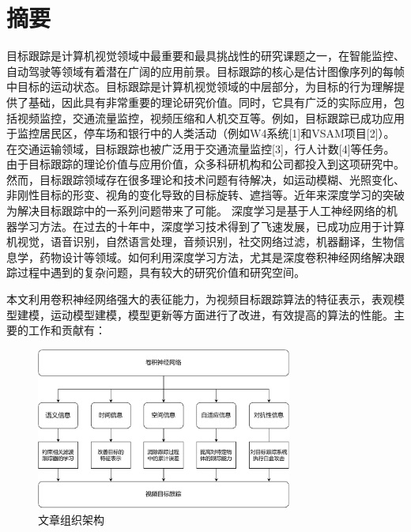 \maketitle%
\MAKETITLE%
\makedeclaration%
\intobmk\chapter*{摘\quad 要}%
\setcounter{page}{1}%

目标跟踪是计算机视觉领域中最重要和最具挑战性的研究课题之一，在智能监控、自动驾驶等领域有着潜在广阔的应用前景。目标跟踪的核心是估计图像序列的每帧中目标的运动状态。目标跟踪是计算机视觉领域的中层部分，为目标的行为理解提供了基础，因此具有非常重要的理论研究价值。同时，它具有广泛的实际应用，包括视频监控，交通流量监控，视频压缩和人机交互等。例如，目标跟踪已成功应用于监控居民区，停车场和银行中的人类活动（例如W4系统[1]和VSAM项目[2]）。在交通运输领域，目标跟踪也被广泛用于交通流量监控[3]，行人计数[4]等任务。
由于目标跟踪的理论价值与应用价值，众多科研机构和公司都投入到这项研究中。然而，目标跟踪领域存在很多理论和技术问题有待解决，如运动模糊、光照变化、非刚性目标的形变、视角的变化导致的目标旋转、遮挡等。近年来深度学习的突破为解决目标跟踪中的一系列问题带来了可能。
深度学习是基于人工神经网络的机器学习方法。在过去的十年中，深度学习技术得到了飞速发展，已成功应用于计算机视觉，语音识别，自然语言处理，音频识别，社交网络过滤，机器翻译，生物信息学，药物设计等领域。如何利用深度学习方法，尤其是深度卷积神经网络解决跟踪过程中遇到的复杂问题，具有较大的研究价值和研究空间。

本文利用卷积神经网络强大的表征能力，为视频目标跟踪算法的特征表示，表观模型建模，运动模型建模，模型更新等方面进行了改进，有效提高的算法的性能。主要的工作和贡献有：

\begin{figure}
\centering
\includegraphics[width=0.75\textwidth]{Img/paper_arch.pdf}
\caption{文章组织架构}
\end{figure}

